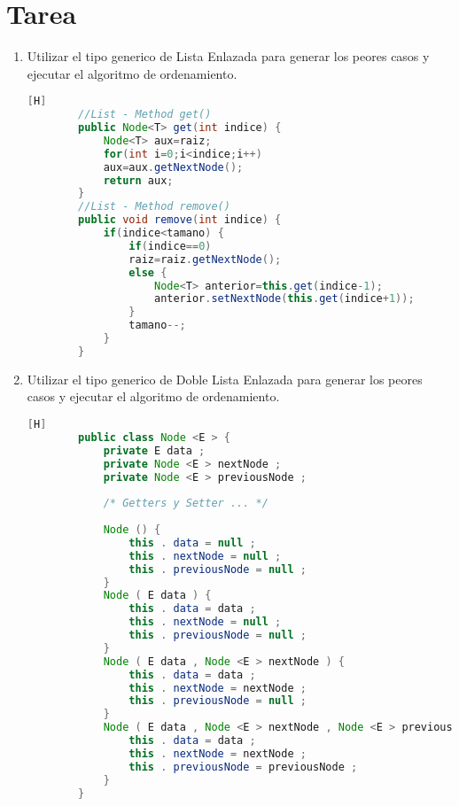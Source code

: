 \section{Tarea}
\begin{enumerate}[{Ejercicio} 1.]
	\item Utilizar el tipo generico de Lista Enlazada para generar los peores casos y ejecutar el
	algoritmo de ordenamiento.\\
	
	\begin{lstlisting}[language=java, caption={caption}][H]
		//List - Method get()
		public Node<T> get(int indice) {
			Node<T> aux=raiz;
			for(int i=0;i<indice;i++)
			aux=aux.getNextNode();
			return aux;
		}
		//List - Method remove()
		public void remove(int indice) {
			if(indice<tamano) {
				if(indice==0)
				raiz=raiz.getNextNode();
				else {
					Node<T> anterior=this.get(indice-1);
					anterior.setNextNode(this.get(indice+1));
				}
				tamano--;
			}
		}
	\end{lstlisting}
	
	
	\item Utilizar el tipo generico de Doble Lista Enlazada para generar los peores casos y ejecutar
	el algoritmo de ordenamiento.
	
	\begin{lstlisting}[language=java, caption={caption}][H]
		public class Node <E > {
			private E data ;
			private Node <E > nextNode ;
			private Node <E > previousNode ;
			
			/* Getters y Setter ... */
			
			Node () {
				this . data = null ;
				this . nextNode = null ;
				this . previousNode = null ;
			}
			Node ( E data ) {
				this . data = data ;
				this . nextNode = null ;
				this . previousNode = null ;
			}
			Node ( E data , Node <E > nextNode ) {
				this . data = data ;
				this . nextNode = nextNode ;
				this . previousNode = null ;
			}
			Node ( E data , Node <E > nextNode , Node <E > previousNode ) {
				this . data = data ;
				this . nextNode = nextNode ;
				this . previousNode = previousNode ;
			}
		}
	\end{lstlisting}
	
\end{enumerate}
